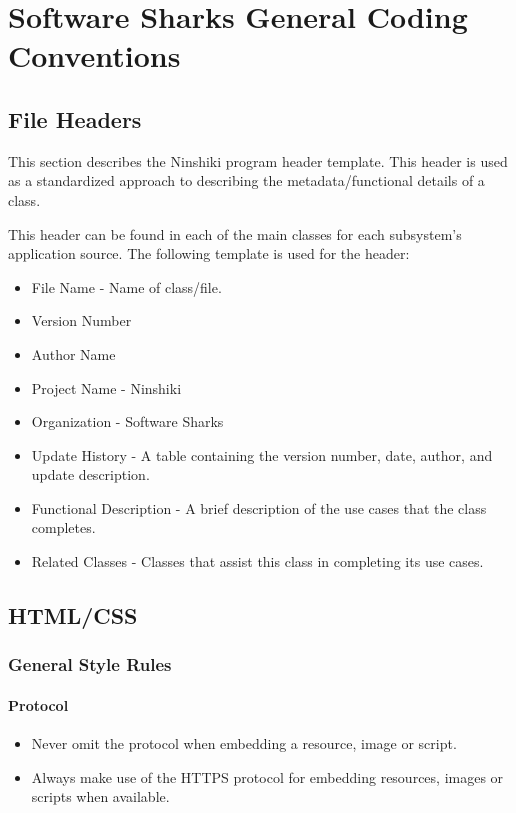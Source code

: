 \documentclass[a4paper, 11pt]{article}
\begin{document}
\pagebreak
\section{Software Sharks General Coding Conventions}
\subsection{File Headers}
This section describes the Ninshiki program header template. This header is used as a standardized approach to describing the metadata/functional details of a class.

This header can be found in each of the main classes for each subsystem’s application source.
The following template is used for the header:
\begin{itemize}
\item File Name - Name of class/file.
\item Version Number
\item Author Name
\item Project Name - Ninshiki
\item Organization - Software Sharks
\item Update History - A table containing the version number, date, author, and update description.
\item Functional Description - A brief description of the use cases that the class completes.
\item Related Classes - Classes that assist this class in completing its use cases.
\end{itemize}
\pagebreak


\subsection{HTML/CSS}
\subsubsection{General Style Rules}
\paragraph{Protocol}
\begin{itemize}
\item Never omit the protocol when embedding a resource, image or script.
\item Always make use of the HTTPS protocol for embedding resources, images or scripts when available. 
\end{itemize}
\end{document}
